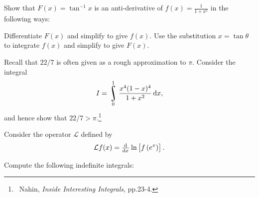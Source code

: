 \begin{questions}
  \question
    \begin{parts}
      \parS Show that $ F(x) = \tan^{-1} x $ is an anti-derivative of $ f(x) = \frac{1}{1 + x^2} $ in the following ways:
        \begin{subparts}
          \subpart Differentiate $ F(x) $ and simplify to give $ f(x) $.
          \subpart Use the substitution $ x = \tan \theta $ to integrate $ f(x) $ and simplify to give $ F(x) $.
        \end{subparts}
      \parO Recall that $ 22/7 $ is often given as a rough approximation to $ \pi $. Consider the integral
            \begin{displaymath}
              I = \rint^1_0 \frac{x^4(1-x)^4}{1 + x^2} \dif{x},
            \end{displaymath}
            and hence show that $ 22/7 > \pi $.\footnote{~Nahin, \textit{Inside Interesting Integrals}, pp.23-4.}
    \end{parts}
  \questioS Consider the operator $ \mathcal{L} $ defined by
            \begin{displaymath}
              \mathcal{L} f(x) = \od{}{x} \ln\left[f\left(e^x\right)\right].
            \end{displaymath}
  \questioS Compute the following indefinite integrals:
    \begin{parts}

\end{parts}
\end{questions}
